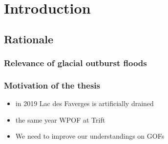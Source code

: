 \chapter{Introduction}
\label{ch:introduction}


\section{Rationale}

\subsection{Relevance of glacial outburst floods}









\subsection{Motivation of the thesis}

\begin{itemize}
    \item in 2019 Lac des Faverges is artificially drained
    \item the same year WPOF at Trift
    \item We need to improve our understandings on GOFs
\end{itemize}



